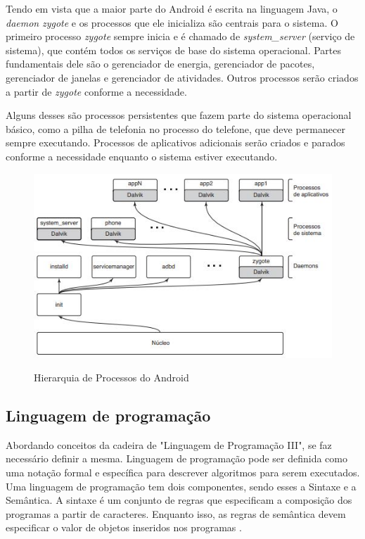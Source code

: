 Tendo em vista que a maior parte do Android é escrita na linguagem Java, o \textit{daemon} \textit{zygote} e os processos que ele inicializa são centrais para o sistema. O primeiro processo \textit{zygote} sempre inicia e é chamado de \textit{system\_server} (serviço de sistema), que contém todos os serviços de base do sistema operacional. Partes fundamentais dele são o gerenciador de energia, gerenciador de pacotes, gerenciador de janelas e gerenciador de atividades.
Outros processos serão criados a partir de \textit{zygote} conforme a necessidade.
 
Alguns desses são processos persistentes que fazem parte do sistema operacional básico, como a pilha de telefonia no processo do telefone, que deve permanecer sempre executando. Processos de aplicativos adicionais serão criados e parados conforme a necessidade enquanto o sistema estiver executando.  

 \begin{figure}[htb]
     \caption{Hierarquia de Processos do Android}
     \centering
     \begin{frame}{
     \includegraphics [scale = 1]{img/arquiteturaandroid_tanembaum.JPG}}
     \end{frame}
     \label{fig:so_arq_android}
 \end{figure}

\newpage

\subsection{Linguagem de programação}
Abordando conceitos da cadeira de "Linguagem de Programação III", se faz necessário definir a mesma. Linguagem de programação pode ser definida como uma notação formal e específica para descrever algoritmos para serem executados. Uma linguagem de programação tem dois componentes, sendo esses a Sintaxe e a Semântica. A sintaxe é um conjunto de regras que especificam a composição dos  programas a partir de caracteres. Enquanto isso, as regras de semântica devem especificar o valor de objetos inseridos nos programas \citep{apostila_lp}. 
   
